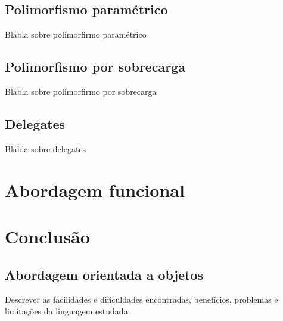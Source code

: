 \documentclass[rel_mlp]{iiufrgs}
\numberwithin{figure}{chapter}
\begin{document}
\section{Polimorfismo paramétrico}

Blabla sobre polimorfirmo paramétrico

\section{Polimorfismo por sobrecarga}

Blabla sobre polimorfirmo por sobrecarga

\section{Delegates}

Blabla sobre delegates

%
\chapter{Abordagem funcional}


%
\chapter{Conclusão}

\section{Abordagem orientada a objetos}

Descrever as facilidades e dificuldades encontradas, benefícios, problemas e limitações da linguagem estudada.


%

%




\end{document}
